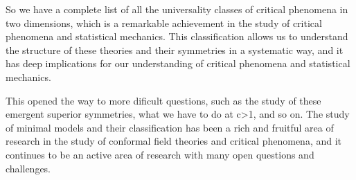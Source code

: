 So we have a complete list of all the universality classes of critical phenomena in two dimensions, which is a remarkable achievement in the study of critical phenomena and statistical mechanics. This classification allows us to understand the structure of these theories and their symmetries in a systematic way, and it has deep implications for our understanding of critical phenomena and statistical mechanics.

This opened the way to more dificult questions, such as the study of these emergent superior symmetries, what we have to do at c>1, and so on. The study of minimal models and their classification has been a rich and fruitful area of research in the study of conformal field theories and critical phenomena, and it continues to be an active area of research with many open questions and challenges.